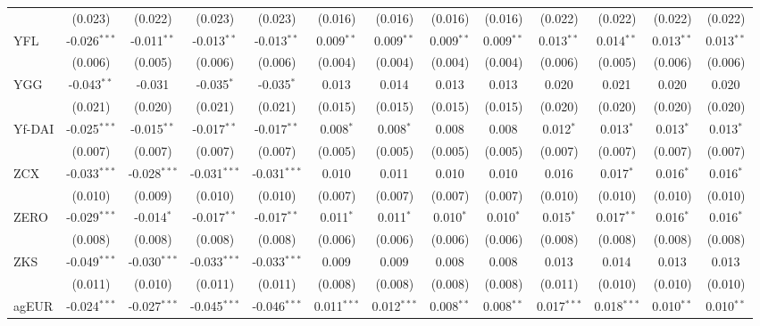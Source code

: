 \begin{table}[!htbp]
\begin{tabular}{@{\extracolsep{5pt}}lcccccccccccc}
  & (0.023) & (0.022) & (0.023) & (0.023) & (0.016) & (0.016) & (0.016) & (0.016) & (0.022) & (0.022) & (0.022) & (0.022) \\
 YFL & -0.026$^{***}$ & -0.011$^{**}$ & -0.013$^{**}$ & -0.013$^{**}$ & 0.009$^{**}$ & 0.009$^{**}$ & 0.009$^{**}$ & 0.009$^{**}$ & 0.013$^{**}$ & 0.014$^{**}$ & 0.013$^{**}$ & 0.013$^{**}$ \\
  & (0.006) & (0.005) & (0.006) & (0.006) & (0.004) & (0.004) & (0.004) & (0.004) & (0.006) & (0.005) & (0.006) & (0.006) \\
 YGG & -0.043$^{**}$ & -0.031$^{}$ & -0.035$^{*}$ & -0.035$^{*}$ & 0.013$^{}$ & 0.014$^{}$ & 0.013$^{}$ & 0.013$^{}$ & 0.020$^{}$ & 0.021$^{}$ & 0.020$^{}$ & 0.020$^{}$ \\
  & (0.021) & (0.020) & (0.021) & (0.021) & (0.015) & (0.015) & (0.015) & (0.015) & (0.020) & (0.020) & (0.020) & (0.020) \\
 Yf-DAI & -0.025$^{***}$ & -0.015$^{**}$ & -0.017$^{**}$ & -0.017$^{**}$ & 0.008$^{*}$ & 0.008$^{*}$ & 0.008$^{}$ & 0.008$^{}$ & 0.012$^{*}$ & 0.013$^{*}$ & 0.013$^{*}$ & 0.013$^{*}$ \\
  & (0.007) & (0.007) & (0.007) & (0.007) & (0.005) & (0.005) & (0.005) & (0.005) & (0.007) & (0.007) & (0.007) & (0.007) \\
 ZCX & -0.033$^{***}$ & -0.028$^{***}$ & -0.031$^{***}$ & -0.031$^{***}$ & 0.010$^{}$ & 0.011$^{}$ & 0.010$^{}$ & 0.010$^{}$ & 0.016$^{}$ & 0.017$^{*}$ & 0.016$^{*}$ & 0.016$^{*}$ \\
  & (0.010) & (0.009) & (0.010) & (0.010) & (0.007) & (0.007) & (0.007) & (0.007) & (0.010) & (0.010) & (0.010) & (0.010) \\
 ZERO & -0.029$^{***}$ & -0.014$^{*}$ & -0.017$^{**}$ & -0.017$^{**}$ & 0.011$^{*}$ & 0.011$^{*}$ & 0.010$^{*}$ & 0.010$^{*}$ & 0.015$^{*}$ & 0.017$^{**}$ & 0.016$^{*}$ & 0.016$^{*}$ \\
  & (0.008) & (0.008) & (0.008) & (0.008) & (0.006) & (0.006) & (0.006) & (0.006) & (0.008) & (0.008) & (0.008) & (0.008) \\
 ZKS & -0.049$^{***}$ & -0.030$^{***}$ & -0.033$^{***}$ & -0.033$^{***}$ & 0.009$^{}$ & 0.009$^{}$ & 0.008$^{}$ & 0.008$^{}$ & 0.013$^{}$ & 0.014$^{}$ & 0.013$^{}$ & 0.013$^{}$ \\
  & (0.011) & (0.010) & (0.011) & (0.011) & (0.008) & (0.008) & (0.008) & (0.008) & (0.011) & (0.010) & (0.010) & (0.010) \\
 agEUR & -0.024$^{***}$ & -0.027$^{***}$ & -0.045$^{***}$ & -0.046$^{***}$ & 0.011$^{***}$ & 0.012$^{***}$ & 0.008$^{**}$ & 0.008$^{**}$ & 0.017$^{***}$ & 0.018$^{***}$ & 0.010$^{**}$ & 0.010$^{**}$ \\

\end{tabular}
\end{table}
